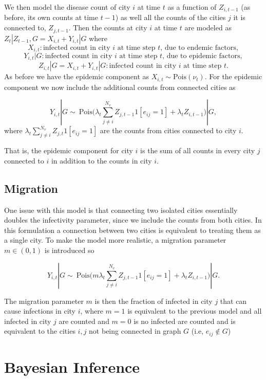 \documentclass[11pt,a4paper]{article}
\numberwithin{equation}{section}
\begin{document}
We then model the disease count of city \(i\) at time \(t\) as a
function of \(Z_{i,t-1}\) (as before, its own counts at time \(t-1\)) as
well all the counts of the cities \(j\) it is connected to,
\(Z_{j,t-1}\). Then the counts at city \(i\) at time \(t\) are modeled
as \(Z_t|Z_{t-1}, G = X_{i, t} + Y_{i,t}|G\) where
\[X_{i,t}: \text{infected count in city } i \text{ at time step } t \text{, due to endemic factors}, \]
\[Y_{i,t}|G : \text{infected count in city } i \text{ at time step } t \text{, due to epidemic factors}, \]
\[Z_{i,t}|G = X_{i,t} + Y_{i,t}|G: \text{infected count in city } i \text{ at time step } t.\]
As before we have the epidemic component as
\(X_{i,t} \sim\text{Pois}(\nu_t)\). For the epidemic component we now
include the additional counts from connected cities as

\[Y_{i,t}|G \sim ~ \text{Pois}\big(\lambda_t\sum_{j\neq i}^{N_v}Z_{j,t-1}1[e_{ij}=1]+ \lambda_tZ_{i,t-1}\big)|G, \]
where \(\lambda_t\sum_{j\neq i}^{N_v}Z_{j,t}1[e_{ij}=1]\) are the counts
from cities connected to city \(i\).

That is, the epidemic component for city \(i\) is the sum of all counts
in every city \(j\) connected to \(i\) in addition to the counts in city
\(i\).

\hypertarget{migration}{%
\subsection{Migration}\label{migration}}

One issue with this model is that connecting two isolated cities
essentially doubles the infectivity parameter, since we include the
counts from both cities. In this formulation a connection between two
cities is equivalent to treating them as a single city. To make the
model more realistic, a migration parameter \(m \in (0,1)\) is
introduced so

\[Y_{i,t}|G \sim ~ \text{Pois}\big(m\lambda_t\sum_{j\neq i}^{N_v}Z_{j,t-1}1[e_{ij}=1]+ \lambda_tZ_{i,t-1}\big)|G.\]

The migration parameter \(m\) is then the fraction of infected in city
\(j\) that can cause infections in city \(i\), where \(m = 1\) is
equivalent to the previous model and all infected in city \(j\) are
counted and \(m = 0\) is no infected are counted and is equivalent to
the cities \(i,j\) not being connected in graph \(G\) (i.e,
\(e_{ij} \notin G\))

\hypertarget{bayesian-inference}{%
\section{Bayesian Inference}\label{bayesian-inference}}
\end{document}
